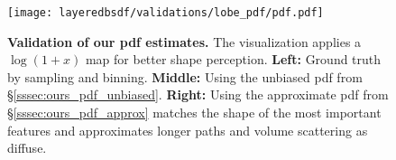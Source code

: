 \begin{figure}[h]
	\centering
	\texttt{[image: layeredbsdf/validations/lobe\_pdf/pdf.pdf]}
	\caption[Validation of our pdf estimates]{\label{fig:layeredbsdf:validate_pdf}
		\textbf{Validation of our pdf estimates.} The visualization applies a $\log(1+x)$ map for better shape perception. \textbf{Left:} Ground truth by sampling and binning. \textbf{Middle:} Using the unbiased pdf from \S\ref{sssec:ours_pdf_unbiased}. \textbf{Right:} Using the approximate pdf from \S\ref{sssec:ours_pdf_approx} matches the shape of the most important features and approximates longer paths and volume scattering as diffuse.
	}
\end{figure}
